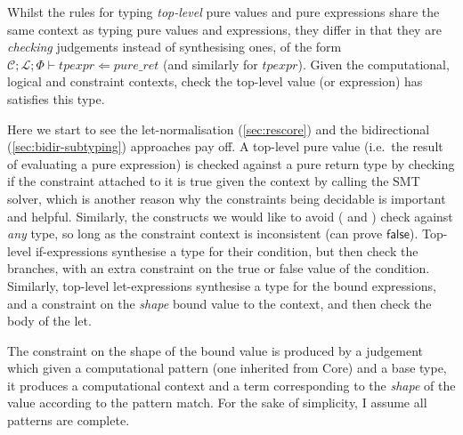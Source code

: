 Whilst the rules for typing \emph{top-level} pure values and pure expressions
share the same context as typing pure values and expressions, they differ in
that they are \emph{checking} judgements instead of synthesising ones, of the
form $\mathcal{C}; \mathcal{L}; \Phi \vdash \mathit{tpexpr} \Leftarrow
\mathit{pure\_ret}$ (and similarly for $\mathit{tpexpr}$). Given the
computational, logical and constraint contexts, check the top-level value (or
expression) has satisfies this type.

Here we start to see the let-normalisation (\cref{sec:rescore}) and the
bidirectional (\cref{sec:bidir-subtyping}) approaches pay off. A top-level pure
value (i.e.\ the result of evaluating a pure expression) is checked against a
pure return type by checking if the constraint attached to it is true given the
context by calling the SMT solver, which is another reason why the constraints
being decidable is important and helpful. Similarly, the constructs we would
like to avoid ( and ) check against %
\emph{any} type, so long as the constraint context is inconsistent (can prove
$\mathsf{false}$). Top-level if-expressions synthesise a type for their condition,
but then check the branches, with an extra constraint on the true or false
value of the condition. Similarly, top-level let-expressions synthesise a type
for the bound expressions, and a constraint on the \emph{shape} bound value to
the context, and then check the body of the let.

The constraint on the shape of the bound value is produced by a judgement which
given a computational pattern (one inherited from Core) and a base type, it
produces a computational context and a term corresponding to the \emph{shape}
of the value according to the pattern match. For the sake of simplicity, I
assume all patterns are complete.

